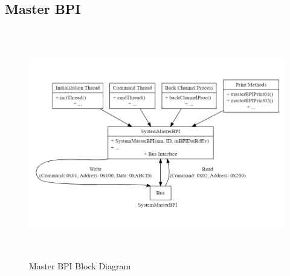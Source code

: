 \documentclass[a4paper,12pt,english]{report}
\begin{document}
\subsection{Master BPI}
\begin{figure}[h!]
\centering
\includegraphics[width=18cm, height=10cm]{Master BPI.png}
\caption{Master BPI Block Diagram}
\end{figure}
\end{document}
